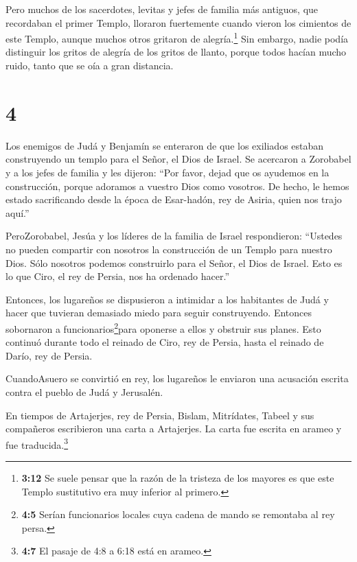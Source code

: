  Pero muchos de los sacerdotes, levitas y jefes de familia
más antiguos, que recordaban el primer Templo, lloraron fuertemente
cuando vieron los cimientos de este Templo, aunque muchos otros gritaron
de alegría.\footnote{\textbf{3:12} Se suele pensar que la razón de la
  tristeza de los mayores es que este Templo sustitutivo era muy
  inferior al primero.}  Sin embargo, nadie podía
distinguir los gritos de alegría de los gritos de llanto, porque todos
hacían mucho ruido, tanto que se oía a gran distancia.

\hypertarget{section-3}{%
\section{4}\label{section-3}}

 Los enemigos de Judá y Benjamín se enteraron de que los
exiliados estaban construyendo un templo para el Señor, el Dios de
Israel.  Se acercaron a Zorobabel y a los jefes de familia y
les dijeron: ``Por favor, dejad que os ayudemos en la construcción,
porque adoramos a vuestro Dios como vosotros. De hecho, le hemos estado
sacrificando desde la época de Esar-hadón, rey de Asiria, quien nos
trajo aquí.''

 PeroZorobabel, Jesúa y los líderes de la familia de Israel
respondieron: ``Ustedes no pueden compartir con nosotros la construcción
de un Templo para nuestro Dios. Sólo nosotros podemos construirlo para
el Señor, el Dios de Israel. Esto es lo que Ciro, el rey de Persia, nos
ha ordenado hacer.''

 Entonces, los lugareños se dispusieron a intimidar a los
habitantes de Judá y hacer que tuvieran demasiado miedo para seguir
construyendo.  Entonces sobornaron a
funcionarios\footnote{\textbf{4:5} Serían funcionarios locales cuya
  cadena de mando se remontaba al rey persa.}para oponerse a ellos y
obstruir sus planes. Esto continuó durante todo el reinado de Ciro, rey
de Persia, hasta el reinado de Darío, rey de Persia.

 CuandoAsuero se convirtió en rey, los lugareños le enviaron
una acusación escrita contra el pueblo de Judá y Jerusalén.

 En tiempos de Artajerjes, rey de Persia, Bislam,
Mitrídates, Tabeel y sus compañeros escribieron una carta a Artajerjes.
La carta fue escrita en arameo y fue traducida.\footnote{\textbf{4:7} El
  pasaje de 4:8 a 6:18 está en arameo.}

